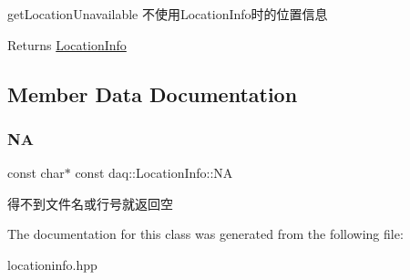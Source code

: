 get\+Location\+Unavailable 不使用\+Location\+Info时的位置信息 

\begin{DoxyReturn}{Returns}
\hyperlink{classdaq_1_1LocationInfo}{Location\+Info} 
\end{DoxyReturn}


\subsection{Member Data Documentation}
\mbox{\label{classdaq_1_1LocationInfo_aea318a7eecc96e89ac2470810071111c}} 
\subsubsection{\texorpdfstring{NA}{NA}}
{\footnotesize\ttfamily const char$\ast$ const daq\+::\+Location\+Info\+::\+NA\hspace{0.3cm}{\ttfamily [static]}}

得不到文件名或行号就返回空 

The documentation for this class was generated from the following file\+:\begin{DoxyCompactItemize}
\item 
locationinfo.\+hpp\end{DoxyCompactItemize}
